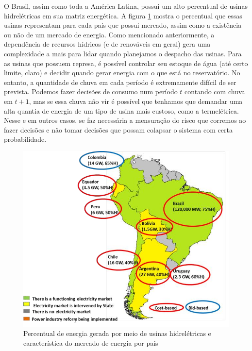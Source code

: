 O Brasil, assim como toda a América Latina, possui um alto percentual de usinas hidrelétricas em sua matriz energética. A figura \ref{fig:hidro-america-sul} mostra o percentual que essas usinas representam para cada país que possui mercado, assim como a existência ou não de um mercado de energia. 
Como mencionado anteriormente, a dependência de recursos hídricos (e de renováveis em geral) gera uma complexidade a mais para lidar quando planejamos o despacho das usinas. Para as usinas que possuem represa, é possível controlar seu estoque de água (até certo limite, claro) e decidir quando gerar energia com o que está no reservatório. No entanto, a quantidade de chuva em cada período é extremamente difícil de ser prevista. 
Podemos fazer decisões de consumo num período $t$ contando com chuva em $t+1$, mas se essa chuva não vir é possível que tenhamos que demandar uma alta quantia de energia de um tipo de usina mais custoso, como a termelétrica. Nesse e em outros casos, se faz necessária a mensuração do risco que corremos ao fazer decisões e não tomar decisões que possam colapsar o sistema com certa probabilidade. 


\begin{figure}[h]
\begin{centering}
\includegraphics[scale=0.6]{anexos/hidro-america-sul.png}
\par\end{centering}

\caption{\label{fig:hidro-america-sul} Percentual de energia gerada por meio de usinas hidrelétricas e característica do mercado de energia por país}
\end{figure}


